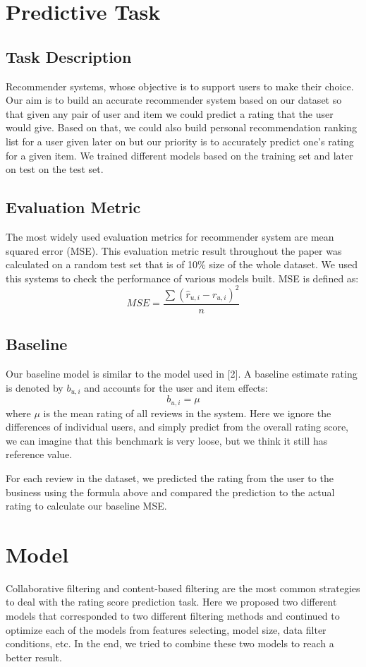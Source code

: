 \documentclass[sigconf]{acmart}
\begin{document}
\section{Predictive Task}
\subsection{Task Description}
Recommender systems, whose objective is to support users to make their choice. Our aim is to build an accurate recommender system based on our dataset so that given any pair of user and item we could predict a rating that the user would give. Based on that, we could also build personal recommendation ranking list for a user given later on but our priority is to accurately predict one's rating for a given item. We trained different models based on the training set and later on test on the test set.
\subsection{Evaluation Metric}
The most widely used evaluation metrics for recommender system are mean squared error (MSE)\cite{shani2011evaluating}. This evaluation metric result throughout the paper was calculated on a random test set that is of 10\% size of the whole dataset. We used this systems to check the performance of various models built. MSE is defined as:
\begin{equation}
    MSE = \frac{\sum(\hat{r}_{u, i} - r_{u, i})^2}{n}
\end{equation}
\subsection{Baseline}
Our baseline model is similar to the model used in [2]. A baseline estimate rating is denoted by $b_{u,i}$ and accounts for the user and item effects:
\begin{equation}
    b_{u,i} = \mu
\end{equation}
where $\mu$ is the mean rating of all reviews in the system. Here we ignore the differences of individual users, and simply predict from the overall rating score, we can imagine that this benchmark is very loose, but we think it still has reference value.

For each review in the dataset, we predicted the rating from the user to the business using the formula above and compared the prediction to the actual rating to calculate our baseline MSE. 

\section{Model}
Collaborative filtering and content-based filtering are the most common strategies to deal with the rating score prediction task\cite{si2004unified}. Here we proposed two different models that corresponded to two different filtering methods and continued to optimize each of the models from features selecting, model size, data filter conditions, etc. In the end, we tried to combine these two models to reach a better result.
\end{document}
